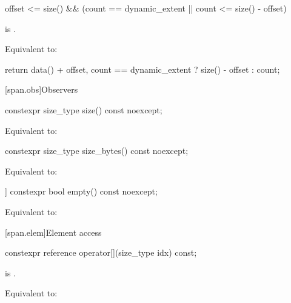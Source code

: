 \begin{itemdescr}
\pnum
\expects
\begin{codeblock}
offset <= size() && (count == dynamic_extent || count <= size() - offset)
\end{codeblock}
is .

\pnum
\effects
Equivalent to:
\begin{codeblock}
return {data() + offset, count == dynamic_extent ? size() - offset : count};
\end{codeblock}
\end{itemdescr}

[span.obs]{Observers}

%
\begin{itemdecl}
constexpr size_type size() const noexcept;
\end{itemdecl}

\begin{itemdescr}
\pnum
\effects
Equivalent to: 
\end{itemdescr}

%
\begin{itemdecl}
constexpr size_type size_bytes() const noexcept;
\end{itemdecl}

\begin{itemdescr}
\pnum
\effects
Equivalent to: 
\end{itemdescr}

%
\begin{itemdecl}
[[nodiscard]] constexpr bool empty() const noexcept;
\end{itemdecl}

\begin{itemdescr}
\pnum
\effects
Equivalent to: 
\end{itemdescr}

[span.elem]{Element access}

%
\begin{itemdecl}
constexpr reference operator[](size_type idx) const;
\end{itemdecl}

\begin{itemdescr}
\pnum
\expects
{} is .

\pnum
\effects
Equivalent to: 
\end{itemdescr}


